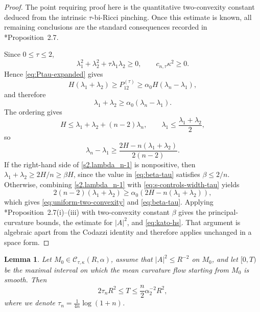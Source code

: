 \documentclass[11pt,reqno]{amsart}
\newtheorem{lemma}[proposition]{Lemma}
\theoremstyle{definition}
\theoremstyle{remark}
\numberwithin{equation}{section}
\newcommand{\CC}{\mathcal C}
\begin{document}
\begin{proof}
The point requiring proof here is the quantitative two-convexity constant
deduced from the intrinsic $\tau$-bi-Ricci pinching.  Once this estimate is
known, all remaining conclusions are the standard consequences recorded in
\cite{HS09}*{Proposition~2.7}.

Since $0\leq\tau\leq2$,
\begin{equation*}
 \lambda_1^2+\lambda_2^2+\tau\lambda_1\lambda_2\geq0,
 \qquad c_{n,\tau}\kappa^2\geq0.
\end{equation*}
Hence \eqref{eq:Ptau-expanded} gives
\begin{equation*}
 H(\lambda_1+\lambda_2)\geq P_{12}^{(\tau)}
 \geq\alpha_0H(\lambda_n-\lambda_1),
\end{equation*}
and therefore
\begin{equation}\label{eq:s-controls-width-tau}
 \lambda_1+\lambda_2\geq\alpha_0(\lambda_n-\lambda_1).
\end{equation}
The ordering gives
\begin{equation*}
 H\leq \lambda_1+\lambda_2+(n-2)\lambda_n,
 \qquad \lambda_1\leq\frac {\lambda_1+\lambda_2}{2},
\end{equation*}
so
\begin{equation}\label{s2.lambda_n-1}
 \lambda_n-\lambda_1
 \geq\frac{2H-n(\lambda_1+\lambda_2)}{2(n-2)}.
\end{equation}
If the right-hand side of \eqref{s2.lambda_n-1} is nonpositive, then
$\lambda_1+\lambda_2\geq2H/n\geq\beta H$, since the value in
\eqref{eq:beta-tau} satisfies $\beta\leq2/n$.  Otherwise,
combining \eqref{s2.lambda_n-1} with \eqref{eq:s-controls-width-tau} yields
\begin{equation*}
 2(n-2)(\lambda_1+\lambda_2)\geq\alpha_0(2H-n(\lambda_1+\lambda_2)),
\end{equation*}
which gives \eqref{eq:uniform-two-convexity} and
\eqref{eq:beta-tau}.  Applying
\cite{HS09}*{Proposition~2.7(i)--(iii)} with two-convexity constant $\beta$
gives the principal-curvature bounds, the estimate for $|A|^2$, and
\eqref{eq:kato-hs}.  That argument is algebraic apart from the Codazzi
identity and therefore applies unchanged in a space form.
\end{proof}

\begin{lemma}\label{lem:time-upper}
Let $M_0\in\CC_{\tau,\kappa}(R,\alpha)$, assume that
$|A|^2\leq R^{-2}$ on $M_0$, and let $[0,T)$ be the maximal interval on
which the mean curvature flow starting from $M_0$ is smooth.  Then
\begin{equation}\label{eq:time-upper}
 2\tau_nR^2\leq T\leq\frac n2\alpha_2^{-2}R^2,
\end{equation}
where we denote $ \tau_n=\frac{1}{4n}\log(1+n)$. 
\end{lemma}
\end{document}
